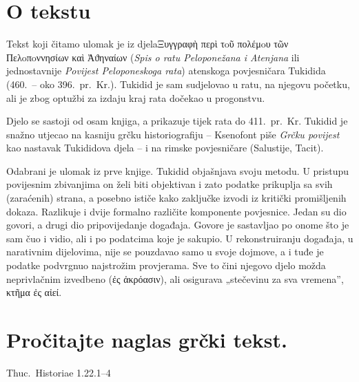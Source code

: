 
\section*{O tekstu}

Tekst koji čitamo ulomak je iz djela\textgreek[variant=ancient]{Ξυγγραφὴ περὶ τoῦ πολέμoυ τῶν Пελoπoννησίων καὶ Ἀϑηναίων} (\textit{Spis o ratu Peloponežana i Atenjana} ili jednostavnije \textit{Povijest Peloponeskoga rata}) atenskoga povjesničara Tukidida (460.\ – oko 396.\ pr.~Kr.). Tukidid je sam sudjelovao u ratu, na njegovu početku, ali je zbog optužbi za izdaju kraj rata dočekao u progonstvu. 

Djelo se sastoji od osam knjiga, a prikazuje tijek rata do 411.\ pr.~Kr. Tukidid je snažno utjecao na kasniju grčku historiografiju – Ksenofont piše \textit{Grčku povijest} kao nastavak Tukididova djela – i na rimske povjesničare (Salustije, Tacit).

Odabrani je ulomak iz prve knjige. Tukidid objašnjava svoju metodu. U pristupu povijesnim zbivanjima on želi biti objektivan i zato podatke prikuplja sa svih (zaraćenih) strana, a posebno ističe kako zaključke izvodi iz kritički promišljenih dokaza. Razlikuje i dvije formalno različite komponente povjesnice. Jedan su dio govori, a drugi dio pripovijedanje događaja. Govore je sastavljao po onome što je sam čuo i vidio, ali i po podatcima koje je sakupio. U rekonstruiranju događaja, u narativnim dijelovima, nije se pouzdavao samo u svoje dojmove, a i tuđe je podatke podvrgnuo najstrožim provjerama. Sve to čini njegovo djelo možda neprivlačnim izvedbeno \textgreek[variant=ancient]{(ἐς ἀκρόασιν)}, ali osigurava „stečevinu za sva vremena”, \textgreek[variant=ancient]{κτῆμα ἐς αἰεί.}

\newpage

\section*{Pročitajte naglas grčki tekst.}

Thuc.\ Historiae 1.22.1–4


\medskip


